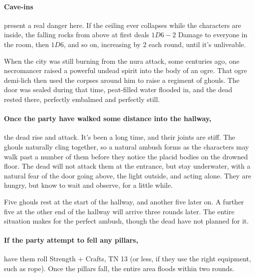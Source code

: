 \begin{multicols}{2}
\paragraph{Cave-ins} present a real danger here.  If the ceiling ever collapses while the characters are inside, the falling rocks from above at first deals $1D6-2$ Damage to everyone in the room, then $1D6$, and so on, increasing by 2 each round, until it's unliveable.


\begin{exampletext}

When the city was still burning from the nura attack, some centuries ago, one necromancer raised a powerful undead spirit into the body of an ogre.
That ogre demi-lich then used the corpses around him to raise a regiment of ghouls.
The door was sealed during that time, peat-filled water flooded in, and the dead rested there, perfectly embalmed and perfectly still.

\end{exampletext}

\paragraph{Once the party have walked some distance into the hallway,}
the dead rise and attack.
It's been a long time, and their joints are stiff.
The ghouls naturally cling together, so a natural ambush forms as the characters may walk past a number of them before they notice the placid bodies on the drowned floor.
The dead will not attack them at the entrance, but stay underwater, with a natural fear of the door going above, the light outside, and acting alone.
They are hungry, but know to wait and observe, for a little while.

Five ghouls rest at the start of the hallway, and another five later on.
A further five at the other end of the hallway will arrive three rounds later.
The entire situation makes for the perfect ambush, though the dead have not planned for it.


\paragraph{If the party attempt to fell any pillars,}
have them roll Strength + Crafts, TN 13 (or less, if they use the right equipment, such as rope).
Once the pillars fall, the entire area floods within two rounds.


\end{multicols}
